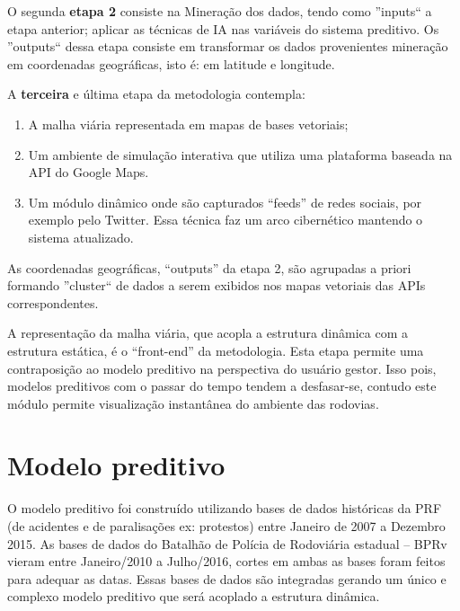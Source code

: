  
O segunda \textbf{etapa 2} consiste na Mineração dos dados, tendo como ''inputs`` a etapa anterior; aplicar as técnicas de IA nas variáveis do sistema preditivo.
Os ''outputs`` dessa etapa consiste em transformar os dados provenientes mineração em coordenadas geográficas, isto é: em latitude e longitude.  
 
A \textbf{terceira} e última etapa da metodologia contempla:
 \begin{enumerate}
  \item A malha viária representada em mapas de bases vetoriais;
  \item Um ambiente de simulação interativa que utiliza uma plataforma baseada na API do Google Maps.
  \item Um módulo dinâmico onde são capturados ``feeds'' de redes sociais, por exemplo pelo Twitter. 
	Essa técnica faz um arco cibernético mantendo o sistema atualizado.
\end{enumerate}

As coordenadas geográficas, ``outputs'' da etapa 2, são agrupadas a priori formando ''cluster`` de dados 
a serem exibidos nos mapas vetoriais das APIs correspondentes.

A representação da malha viária, que acopla a estrutura dinâmica com a estrutura estática, é o ``front-end'' da metodologia. 
Esta etapa permite uma contraposição ao modelo preditivo na perspectiva do usuário gestor. 
Isso pois, modelos preditivos com o passar do tempo tendem a desfasar-se, contudo este módulo permite visualização
instantânea do ambiente das rodovias. 
 


\section{Modelo preditivo}

O modelo preditivo foi construído utilizando bases de dados históricas da PRF (de acidentes e de paralisações ex: protestos) entre Janeiro de 2007 a 
Dezembro 2015. As bases de dados do Batalhão de Polícia de Rodoviária estadual -- BPRv vieram entre Janeiro/2010 a Julho/2016, cortes em ambas as bases foram 
feitos para adequar as datas. Essas bases de dados são integradas gerando um único e complexo modelo preditivo que será acoplado a estrutura dinâmica.


